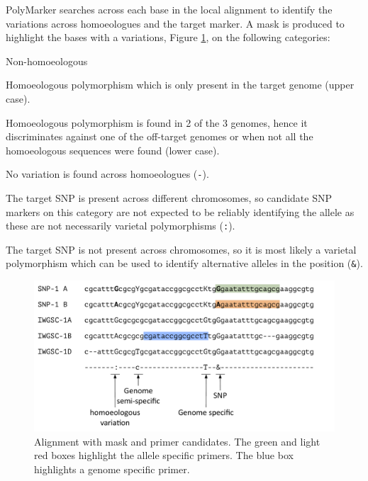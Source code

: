 PolyMarker searches across each base in the local alignment to identify the variations across homoeologues and the target marker.
A mask is produced to highlight the bases with a variations, Figure \ref{fig:poly:mask}, on the following categories:
\begin{labeling}{Non-homoeologous}
\item [Specific] Homoeologous polymorphism which is only present in the target genome (upper case).
\item [Semi-specific] Homoeologous polymorphism is found in 2 of the 3 genomes, hence it discriminates against one of the off-target genomes or when not all the homoeologous sequences were found (lower case).
\item [Non-specific] No variation is found across homoeologues (\texttt{-}).
\item [Homoeologous] The target SNP is present across different chromosomes, so candidate SNP markers on this category are not expected to be reliably identifying the allele as these are not necessarily varietal polymorphisms (\texttt{:}).
\item [Non-homoeologous] The target SNP is not present across chromosomes, so it is most likely a varietal polymorphism which can be used to identify alternative alleles in the position (\texttt{\&}).
\end{labeling} 


\begin{figure}
\centering
\includegraphics[width=1\textwidth]{PolyMarker/Figures/aln/mask.pdf}
\caption[Alignment with mask and primer candidates.]{Alignment with mask and primer candidates. The green and light red boxes highlight the allele specific primers. The blue box highlights a genome specific primer. }
\label{fig:poly:mask}
\end{figure}

